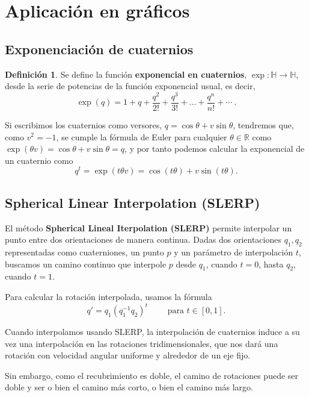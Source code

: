 \documentclass{article}
\theoremstyle{plain}
\theoremstyle{definition}
\newtheorem{definition}{Definición}
\theoremstyle{remark}
\begin{document}
\section{Aplicación en gráficos}

\subsection{Exponenciación de cuaternios}
\begin{definition}
  Se define la función \textbf{exponencial en cuaternios},
  $\exp \colon \mathbb{H} \to \mathbb{H}$, desde la serie de potencias
  de la función exponencial usual, es decir,
  \[\exp(q) =  1 + q + \frac{q^2}{2!} + \frac{q^3}{3!} + \dots + \frac{q^n}{n!} + \cdots\ .
  \]
\end{definition}

Si escribimos los cuaternios como versores,
$q = \cos \theta + v \sin \theta$, tendremos que, como $v^2 = -1$, se
cumple la fórmula de Euler para cualquier $\theta \in \mathbb{R}$ como
$\exp(\theta v) = \cos \theta + v \sin \theta = q$, y por tanto
podemos calcular la exponencial de un cuaternio como
\[q^t = \exp(t \theta v) = \cos (t \theta) + v \sin (t \theta).\]

\subsection{Spherical Linear Interpolation (SLERP)}

El método \textbf{Spherical Lineal Iterpolation (SLERP)} permite
interpolar un punto entre dos orientaciones de manera continua. Dadas
dos orientaciones $q_1,q_2$ representadas como cuaterniones, un punto
$p$ y un parámetro de interpolación $t$, buscamos un camino continuo
que interpole $p$ desde $q_1$, cuando $t=0$, hasta $q_2$, cuando
$t=1$.

Para calcular la rotación interpolada, usamos la fórmula \cite{vince11}
\[q' = q_1(q_1^{-1}q_2)^t \qquad\text{ para } t \in [0,1].\]

Cuando interpolamos usando SLERP, la interpolación de cuaternios
induce a su vez una interpolación en las rotaciones tridimensionales,
que nos dará una rotación con velocidad angular uniforme y alrededor
de un eje fijo.

Sin embargo, como el recubrimiento es doble, el camino de rotaciones
puede ser doble y ser o bien el camino más corto, o bien el camino más
largo.
\end{document}
